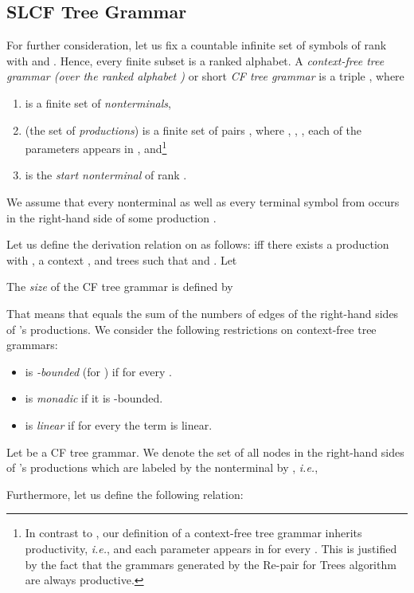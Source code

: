 \documentclass[12pt]{llncs}
\newcommand{\hairsp}{\hspace{1pt}}\newcommand{\TODO}{\textcolor{red}{\bf TODO!}\xspace}
\newcommand{\ie}{\mbox{\textit{i.\hairsp{}e.}}\xspace}
\begin{document}
\subsection{SLCF Tree Grammar}

For further consideration, let us fix a countable infinite set
 of symbols of rank  with
 and
. 
Hence, every finite subset 
 is a ranked alphabet.
A \emph{context-free tree grammar (over the 
ranked alphabet )} or short \emph{CF tree grammar} is a triple , where
\begin{enumerate}[(1)]
	\item  is a finite set of \emph{nonterminals},
	\item  (the set of \emph{productions}) is a finite set of
          pairs , where , ,
          , each of the parameters
           appears in ,
          and\footnote{In contrast to
            \cite{Lohrey09parameterreduction}, our definition of a
            context-free tree grammar inherits productivity, \ie,
             and each parameter
             appears in  for every
            . This is justified by the fact that the 
            grammars generated by the Re-pair for Trees algorithm are always productive.}
	\item  is 
the \emph{start nonterminal} of rank .
\end{enumerate}
We assume that every nonterminal  
as well as every terminal symbol from  
occurs in the right-hand side  of some production . 

Let us define the derivation relation  on
 as follows:  iff there exists a production  with
, a context , and trees  such that 
 and . Let

The \emph{size}  of the CF tree grammar  is defined by

That means that  equals the sum of the numbers of edges of the right-hand sides of 's productions.
We consider the following restrictions on context-free tree grammars:
\begin{itemize}
	\item  is \emph{-bounded} (for ) if  for every .
	\item  is \emph{monadic} if it is -bounded.
	\item  is \emph{linear} if for every  the term  is linear.
\end{itemize}
Let  be a CF tree grammar. 
We denote the set of all nodes in the right-hand 
sides of 's productions which are labeled by the nonterminal  by , \ie,

Furthermore, let us define the following relation:
\end{document}
